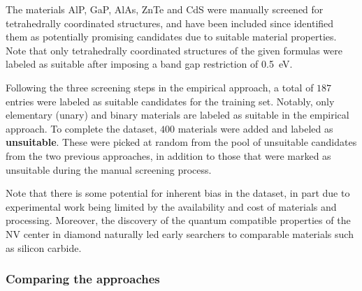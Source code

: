 \documentclass[superscriptaddress,
preprint,
 amsmath,amssymb,
 aps,
]{revtex4-2}
\begin{document}
The materials AlP, GaP, AlAs, ZnTe and CdS were manually screened for tetrahedrally coordinated structures, and have been included since \citeauthor{Weber2010} \cite{Weber2010} identified them as potentially promising candidates due to suitable material properties. 
Note that only tetrahedrally coordinated structures of the given formulas were labeled as suitable after imposing a band gap restriction of \SI{0.5}{\electronvolt}. 

Following the three screening steps in the empirical approach, a total of $187$ entries were labeled as suitable candidates for the training set. Notably, only elementary (unary) and binary materials are labeled as suitable in the empirical approach. To complete the dataset, $400$ materials were added and labeled as \textbf{unsuitable}. These were picked at random from the pool of unsuitable candidates from the two previous approaches, in addition to those that were marked as unsuitable during the manual screening process. 

Note that there is some potential for inherent bias in the dataset, in part due to experimental work being limited by the availability and cost of materials and processing. Moreover, the discovery of the quantum compatible properties of the NV center in diamond naturally led early searchers to comparable materials such as silicon carbide.  %


\subsubsection*{Comparing the approaches}
\end{document}
